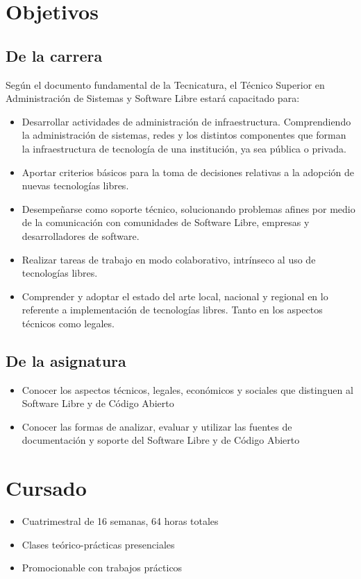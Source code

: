 
\section{Objetivos}
\subsection{De la carrera}
Según el documento fundamental de la Tecnicatura, el Técnico Superior en Administración de Sistemas y Software Libre estará capacitado para:
\begin{itemize}
	\item Desarrollar actividades de administración de infraestructura. Comprendiendo la administración de sistemas, redes y los distintos componentes que forman la
infraestructura de tecnología de una institución, ya sea pública o privada.
	\item Aportar criterios básicos para la toma de decisiones relativas a la adopción de nuevas tecnologías libres.
	\item Desempeñarse como soporte técnico, solucionando problemas afines por medio de la comunicación con comunidades de Software Libre, empresas y desarrolladores de
software.
	\item Realizar tareas de trabajo en modo colaborativo, intrínseco al uso de tecnologías libres.
	\item Comprender y adoptar el estado del arte local, nacional y regional en lo referente a implementación de tecnologías libres. Tanto en los aspectos técnicos como legales.
\end{itemize}
\subsection{De la asignatura}
\begin{itemize}
\item Conocer los aspectos técnicos, legales, económicos y sociales que distinguen al Software Libre y de Código Abierto
\item Conocer las formas de analizar, evaluar y utilizar las fuentes de documentación y soporte del Software Libre y de Código Abierto
\end{itemize}


\section{Cursado}
\begin{itemize}
	\item Cuatrimestral de 16 semanas, 64 horas totales
	\item Clases teórico-prácticas presenciales
	\item Promocionable con trabajos prácticos
\end{itemize}


